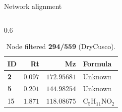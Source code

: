 \documentclass[aspectratio=169]{beamer}
\renewcommand{\alert}[1]{\textbf{\color{swufe}#1}}
\begin{document}
\begin{frame}{Network alignment}
\begin{columns}[t]
            \begin{column}{0.6\textwidth}
                \begin{table}[htp!]
                    \footnotesize %
                    \centering
                    \caption{Node filtered \alert{294/559} (DryCusco).}
                    \begin{tabular}{lrrl}\toprule
                        ID & Rt & Mz & Formula \\\midrule
                        \alert{2}	& $0.097$	& $172.95681$ & Unknown \\
                        \alert{5}	& $0.201$	& $144.98254$ & Unknown \\
                        15	& $1.871$	& $118.08675$ & $\mathrm{C_{5}H_{11}NO_2}$ \\

\end{tabular}
\end{table}
\end{column}
\end{columns}
\end{frame}
\end{document}
